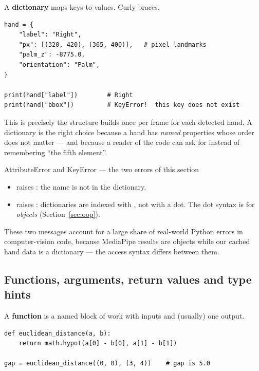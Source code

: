 A \textbf{dictionary} maps keys to values. Curly braces.

\begin{codecard}
\begin{lstlisting}
hand = {
    "label": "Right",
    "px": [(320, 420), (365, 400)],   # pixel landmarks
    "palm_z": -8775.0,
    "orientation": "Palm",
}

print(hand["label"])        # Right
print(hand["bbox"])         # KeyError!  this key does not exist
\end{lstlisting}
\end{codecard}

This is precisely the structure  builds once per frame for each detected hand.
A dictionary is the right choice because a hand has \emph{named} properties whose order does not
matter --- and because a reader of the code can ask for  instead of
remembering ``the fifth element''.

\begin{edgetrap}{AttributeError and KeyError --- the two errors of this section}
\begin{itemize}
  \item {} raises : the name is not in the dictionary.
  \item {} raises : dictionaries are indexed with
        \code{[]}, not with a dot. The dot syntax is for \emph{objects} (Section~\ref{sec:oop}).
\end{itemize}
These two messages account for a large share of real-world Python errors in computer-vision code,
because MediaPipe results are objects while our cached hand data is a dictionary --- the access
syntax differs between them.
\end{edgetrap}

\subsection{Functions, arguments, return values and type hints}
\label{sec:typehints}

A \textbf{function} is a named block of work with inputs and (usually) one output.

\begin{codecard}
\begin{lstlisting}
def euclidean_distance(a, b):
    return math.hypot(a[0] - b[0], a[1] - b[1])

gap = euclidean_distance((0, 0), (3, 4))    # gap is 5.0
\end{lstlisting}
\end{codecard}

